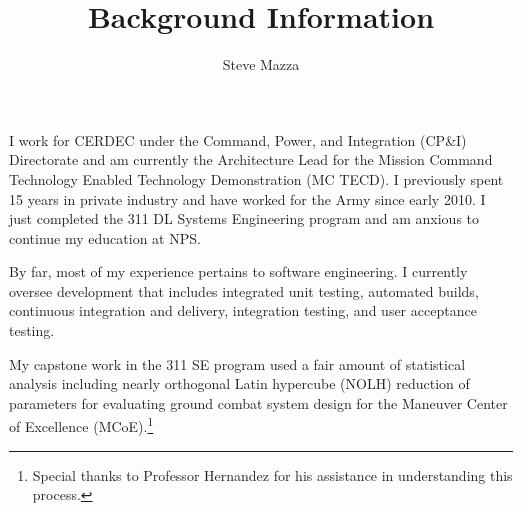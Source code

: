 \documentclass[letterpaper,10pt]{article}
\title{Background Information}
\author{Steve Mazza}
\date{}
\begin{document}
\maketitle

I work for CERDEC under the Command, Power, and Integration (CP\&I) Directorate and am currently the Architecture Lead for the Mission Command Technology Enabled Technology Demonstration (MC TECD).  I previously spent 15 years in private industry and have worked for the Army since early 2010.  I just completed the 311 DL Systems Engineering program and am anxious to continue my education at NPS.

By far, most of my experience pertains to software engineering.  I currently oversee development that includes integrated unit testing, automated builds, continuous integration and delivery, integration testing, and user acceptance testing.

My capstone work in the 311 SE program used a fair amount of statistical analysis including nearly orthogonal Latin hypercube (NOLH) reduction of parameters for evaluating ground combat system design for the Maneuver Center of Excellence (MCoE).\footnote{Special thanks to Professor Hernandez for his assistance in understanding this process.}
\end{document}
